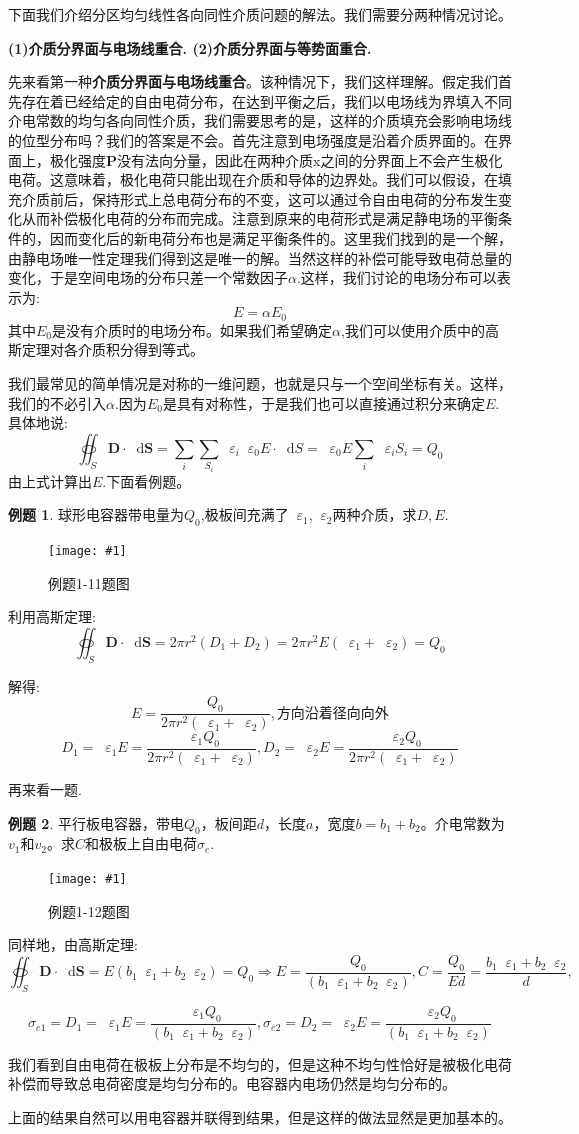 \documentclass[12pt,a4paper,oneside]{report}
\theoremstyle{definition}
\newtheorem{example}{例题}[chapter]
\theoremstyle{remark}
\newcommand{\insertfig}[3]{
    \begin{figure}[ht]
        \centering
        \texttt{[image: \#1]}
        \caption{#2}
        \label{fig:#1}
    \end{figure}
}
\renewcommand{\d}{\mathop{}\!\mathrm{d}}
\renewcommand{\v}{\mathop{}\!\varepsilon}
\begin{document}
下面我们介绍分区均匀线性各向同性介质问题的解法。我们需要分两种情况讨论。

\textbf{(1)介质分界面与电场线重合.
(2)介质分界面与等势面重合.
}

先来看第一种\textbf{介质分界面与电场线重合}。该种情况下，我们这样理解。假定我们首先存在着已经给定的自由电荷分布，在达到平衡之后，我们以电场线为界填入不同介电常数的均匀各向同性介质，我们需要思考的是，这样的介质填充会影响电场线的位型分布吗？我们的答案是不会。首先注意到电场强度是沿着介质界面的。在界面上，极化强度$\mathbf{P}$没有法向分量，因此在两种介质x之间的分界面上不会产生极化电荷。这意味着，极化电荷只能出现在介质和导体的边界处。我们可以假设，在填充介质前后，保持形式上总电荷分布的不变，这可以通过令自由电荷的分布发生变化从而补偿极化电荷的分布而完成。注意到原来的电荷形式是满足静电场的平衡条件的，因而变化后的新电荷分布也是满足平衡条件的。这里我们找到的是一个解，由静电场唯一性定理我们得到这是唯一的解。当然这样的补偿可能导致电荷总量的变化，于是空间电场的分布只差一个常数因子$\alpha$.这样，我们讨论的电场分布可以表示为:
\[
E = \alpha E_0
\]
其中$E_0$是没有介质时的电场分布。如果我们希望确定$\alpha$,我们可以使用介质中的高斯定理对各介质积分得到等式。

我们最常见的简单情况是对称的一维问题，也就是只与一个空间坐标有关。这样，我们的不必引入$\alpha$.因为$E_0$是具有对称性，于是我们也可以直接通过积分来确定$E$. 具体地说:
\[
\oiint_S \mathbf{D} \cdot \d \mathbf{S}  = \sum_i \sum_{S_i}\v_i \v_0 E \cdot \d S = \v_0 E \sum_i \v_i S_i
= Q_0
\]
由上式计算出$E$.下面看例题。

\begin{example}
球形电容器带电量为$Q_0$,极板间充满了$\v_1$,$\v_2$两种介质，求$D,E$.
\insertfig{1-2.png}{例题1-11题图}{0.25}

利用高斯定理:
\[
\oiint_S \mathbf{D} \cdot \d \mathbf{S}  = 2\pi r^2 (D_1+D_2) =2\pi r^2 E(\v_1+\v_2) = Q_0
\]

解得:
\[
E=\frac{Q_0}{2\pi r^2(\v_1+\v_2)}, \text{方向沿着径向向外}
\]
\[
D_1 = \v_1 E = \frac{\v_1 Q_0}{2\pi r^2(\v_1+\v_2)}, D_2 = \v_2 E = \frac{\v_2 Q_0}{2\pi r^2(\v_1+\v_2)}
\]

\end{example}
再来看一题.
\begin{example}
  平行板电容器，带电$Q_0$，板间距$d$，长度$a$，宽度$b=b_1+b_2$。介电常数为$v_1$和$v_2$。求$C$和极板上自由电荷$\sigma_e$.

  \insertfig{1-3.png}{例题1-12题图}{0.4}

  同样地，由高斯定理:
  \[
  \oiint_S \mathbf{D} \cdot \d \mathbf{S}  = E(b_1\v_1+b_2\v_2) = Q_0
  \Rightarrow E=\frac{Q_0}{(b_1\v_1+b_2\v_2)} , C  = \frac{Q_0}{Ed} = \frac{b_1\v_1+b_2\v_2}{d}, 
  \]

  \[
\sigma_{e1} = D_1 = \v_1 E = \frac{\v_1 Q_0}{(b_1\v_1+b_2\v_2)}, \sigma_{e2} = D_2 = \v_2 E = \frac{\v_2 Q_0}{(b_1\v_1+b_2\v_2)}
  \]

我们看到自由电荷在极板上分布是不均匀的，但是这种不均匀性恰好是被极化电荷补偿而导致总电荷密度是均匀分布的。电容器内电场仍然是均匀分布的。

上面的结果自然可以用电容器并联得到结果，但是这样的做法显然是更加基本的。
\end{example}
\end{document}
